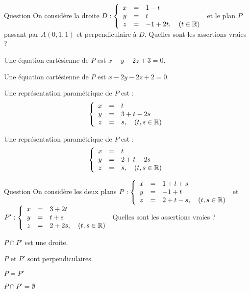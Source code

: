 \begin{multi}[multiple,feedback=
{Un vecteur directeur de \(D\) est un vecteur normal à \(P\).
}]{Question}
On considère la droite \(D : \left\{\begin{array}{ccl}x&=&1-t\\y&=&t\\ z&=&-1+2t,\quad (t \in \mathbb{R}) \end{array}\right.\) et le plan \(P\)  passant par \(A(0,1,1)\) et perpendiculaire à \(D\).  Quelles sont les assertions vraies ?

    \item* Une équation cartésienne de \(P\) est \(x-y-2z+3=0\).
    \item Une équation cartésienne de \(P\) est \(x-2y-2z+2=0\).
    \item* Une représentation paramétrique de \(P\) est :
\[\left\{\begin{array}{ccl}x&=&t\\y&=&3+t-2s\\ z&=&s,\quad (t,s \in \mathbb{R}) \end{array}\right.\]
    \item Une représentation paramétrique de \(P\) est :
\[\left\{\begin{array}{ccl}x&=&t\\y&=&2+t-2s\\ z&=&s,\quad (t,s \in \mathbb{R}) \end{array}\right.\]
\end{multi}


\begin{multi}[multiple,feedback=
{On vérifie que \(P=P'\).
}]{Question}
On considère les deux plans  \(P : \left\{\begin{array}{ccl}x&=&1+t+s\\y&=&-1+t\\ z&=&2+t-s,\quad (t,s  \in \mathbb{R})  \end{array}\right.\) et 
\(P': \left\{\begin{array}{ccl}x&=&3+2t\\y&=&t+s\\ z&=&2+2s,\quad (t,s  \in \mathbb{R}) \end{array}\right.\)  Quelles sont les assertions vraies ?

    \item \(P\cap P'\) est une droite.
    \item \(P\) et \(P'\) sont perpendiculaires.
    \item* \(P=P'\)
    \item \(P\cap P' = \emptyset\)
\end{multi}


